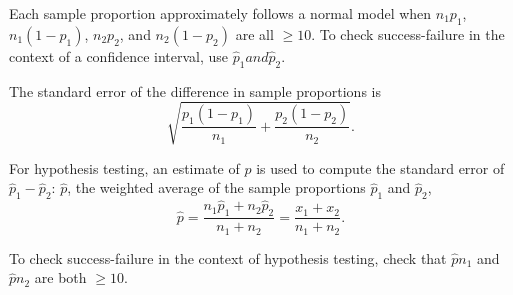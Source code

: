 \documentclass[letterpaper,12pt,twoside,]{pinp}
\begin{document}
Each sample proportion approximately follows a normal model when
\(n_1p_1\), \(n_1(1 - p_1)\), \(n_2p_2\), and \(n_2(1-p_2)\) are all
\(\geq 10\). To check success-failure in the context of a confidence
interval, use \(\hat{p}_1 and \hat{p}_2\).

The standard error of the difference in sample proportions is
\[\sqrt{\dfrac{p_1(1-p_1)}{n_1} + \dfrac{p_2(1-p_2)}{n_2}}. \]

For hypothesis testing, an estimate of \(p\) is used to compute the
standard error of \(\hat{p}_1 - \hat{p}_2\): \(\hat{p}\), the weighted
average of the sample proportions \(\hat{p}_1\) and \(\hat{p}_2\),
\[\hat{p} = \dfrac{n_1\hat{p}_1 + n_2\hat{p}_2}{n_1 + n_2} = \dfrac{x_1 + x_2}{n_1 + n_2}. \]

To check success-failure in the context of hypothesis testing, check
that \(\hat{p}n_1\) and \(\hat{p}n_2\) are both \(\geq 10\).
\end{document}
